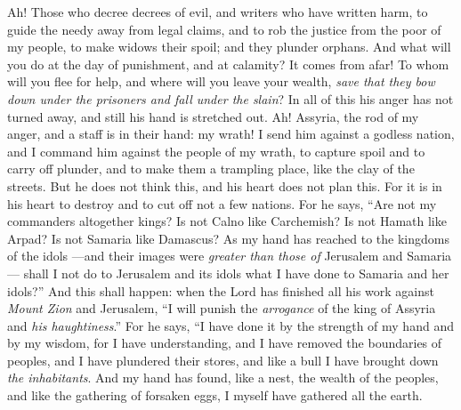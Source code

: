 \begin{biblechapter} %
 Ah! Those who decree decrees of evil, 
and writers who have written harm,
\verse to guide the needy away from legal claims, 
and to rob the justice from the poor of my people, 
to make widows their spoil; 
and they plunder orphans.
\verse And what will you do at the day of punishment, 
and at calamity? It comes from afar! 
To whom will you flee for help, 
and where will you leave your wealth,
\verse \textit{save that they bow down under the prisoners 
and fall under the slain}? 
In all of this his anger has not turned away, 
and still his hand is stretched out.
 Ah! Assyria, the rod of my anger, 
and a staff is in their hand: my wrath!
\verse I send him against a godless nation, 
and I command him against the people of my wrath, 
to capture spoil 
and to carry off plunder, 
and to make them a trampling place, 
like the clay of the streets.
\verse But he does not think this, 
and his heart does not plan this. 
For it is in his heart to destroy 
and to cut off not a few nations.
\verse For he says, “Are not my commanders altogether kings?
\verse Is not Calno like Carchemish? 
Is not Hamath like Arpad? 
Is not Samaria like Damascus?
\verse As my hand has reached to the kingdoms of the idols 
—and their images were \textit{greater than those of} Jerusalem and Samaria—
\verse shall I not do to Jerusalem and its idols 
what I have done to Samaria and her idols?”
\verse And this shall happen: when the Lord has finished all his work against \textit{Mount Zion} and Jerusalem, “I will punish the \textit{arrogance} of the king of Assyria and \textit{his haughtiness}.”
\verse For he says,
\verse “I have done it by the strength of my hand 
and by my wisdom, for I have understanding, 
and I have removed the boundaries of peoples, 
and I have plundered their stores, 
and like a bull I have brought down \textit{the inhabitants}.
\verse And my hand has found, like a nest, the wealth of the peoples, 
and like the gathering of forsaken eggs, I myself have gathered all the earth. 

\end{biblechapter}
